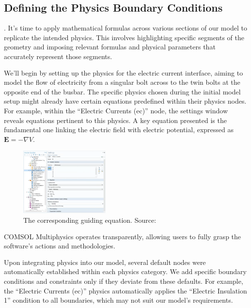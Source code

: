 \subsection{Defining the Physics Boundary Conditions}.
It's time to apply mathematical formulas across various sections of our model to replicate the intended physics. This involves highlighting specific segments of the geometry and imposing relevant formulas and physical parameters that accurately represent those segments.

We'll begin by setting up the physics for the electric current interface, aiming to model the flow of electricity from a singular bolt across to the twin bolts at the opposite end of the busbar. The specific physics chosen during the initial model setup might already have certain equations predefined within their physics nodes. For example, within the ``Electric Currents (ec)'' node, the settings window reveals equations pertinent to this physics. A key equation presented is the fundamental one linking the electric field with electric potential, expressed as $\mathbf{E} = -\nabla V$.

\begin{figure}[ht!]
  \centering
  \includegraphics[width=0.4\textwidth]{Chapters/Figures/Chapter 3 Figures/Electrical Currents Physics Equation.png}
  \caption{The corresponding guiding equation. Source: \cite{multiphysics__modeling_nodate}}
  \label{fig:the guiding equation}
\end{figure}

COMSOL Multiphysics operates transparently, allowing users to fully grasp the software's actions and methodologies.

Upon integrating physics into our model, several default nodes were automatically established within each physics category. We add specific boundary conditions and constraints only if they deviate from these defaults. For example, the ``Electric Currents (ec)'' physics automatically applies the ``Electric Insulation 1'' condition to all boundaries, which may not suit our model's requirements.

